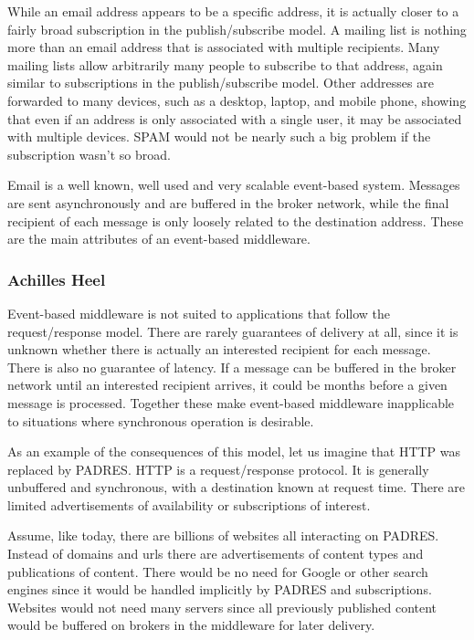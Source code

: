\documentclass{acm_proc_article-sp}
\begin{document}
While an email address appears to be a specific address, it is actually closer to a fairly broad subscription in the publish/subscribe model. A mailing list is nothing more than an email address that is associated with multiple recipients. Many mailing lists allow arbitrarily many people to subscribe to that address, again similar to subscriptions in the publish/subscribe model. Other addresses are forwarded to many devices, such as a desktop, laptop, and mobile phone, showing that even if an address is only associated with a single user, it may be associated with multiple devices. SPAM would not be nearly such a big problem if the subscription wasn't so broad.

Email is a well known, well used and very scalable event-based system. Messages are sent asynchronously and are buffered in the broker network, while the final recipient of each message is only loosely related to the destination address. These are the main attributes of an event-based middleware.



\subsubsection{Achilles Heel}
\label{sec:appsebbad}


Event-based middleware is not suited to applications that follow the request/response model. There are rarely guarantees of delivery  at all, since it is unknown whether there is actually an interested recipient for each message. There is also no guarantee of latency. If a message can be buffered in the broker network until an interested recipient arrives, it could be months before a given message is processed. Together these make event-based middleware inapplicable to situations where synchronous operation is desirable.

As an example of the consequences of this model, let us imagine that HTTP was replaced by PADRES. HTTP is a request/response protocol. It is generally unbuffered and synchronous, with a destination known at request time. There are limited advertisements of availability or subscriptions of interest.

Assume, like today, there are billions of websites all interacting on PADRES. Instead of domains and urls there are advertisements of content types and publications of content. There would be no need for Google or other search engines since it would be handled implicitly by PADRES and subscriptions. Websites would not need many servers since all previously published content would be buffered on brokers in the middleware for later delivery.
\end{document}
